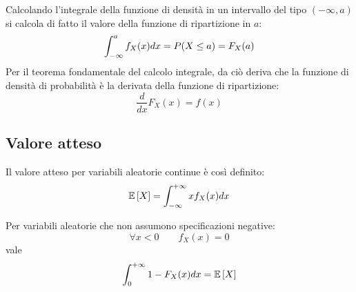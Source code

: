 Calcolando l'integrale della funzione di densità in un intervallo del tipo $(-\infty,a)$ si calcola di fatto il valore della funzione di ripartizione in $a$:
\begin{equation*}
	\int_{-\infty}^a f_X(x)dx = P(X\leq a) = F_X(a) \\
\end{equation*}
Per il teorema fondamentale del calcolo integrale, da ciò deriva che la funzione di densità di probabilità è la derivata della funzione di ripartizione:
\begin{equation*}
	\frac{d}{dx}F_X(x)=f(x)
\end{equation*}

\subsection{Valore atteso}
\begin{defin}
	Il valore atteso per variabili aleatorie continue è così definito:
	\begin{equation*}
		\mathbb{E}\left[ X \right]=\int_{-\infty}^{+\infty} x f_X(x)dx
	\end{equation*}
\end{defin}

\begin{prop} \label{prop:valatnonneg}
	Per variabili aleatorie che non assumono specificazioni negative:
	\begin{equation*}
		\forall x<0 \qquad f_X(x)=0
	\end{equation*}
	vale
	\begin{equation*}
		\int_0^{+\infty} 1-F_X(x)dx = \mathbb{E}\left[ X \right]
	\end{equation*}
\end{prop}

